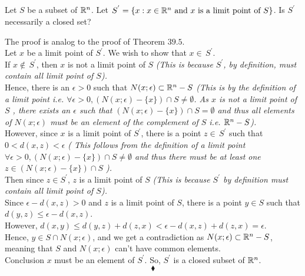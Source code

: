 \subsection{}
\begin{tcolorbox}
Let $S$ be a subset of $\mathbb{R}^n$. Let $S^{'}= \{x:x \in \mathbb{R}^n \text{ and } x \text{ is a limit point of } S\}$. Is $S^{'}$ necessarily a closed set?
\end{tcolorbox}
The proof is analog to the proof of Theorem $\mathbf{39.5}$.\\
Let $x$ be a limit point of $S^{'}$. We wish to show that $x \in \, S^{'}$.\\
If $x \not \in \, S^{'}$, then  $x$ is not a limit point of $S$
    \textit{(This is because $S^{'}$, by definition, must contain all limit point of $S$).}\\
Hence, there is an $\epsilon  > 0$
such that $N(x; \epsilon)\subset \mathbb{R}^n- S$ 
\textit{(This is by the definition of a limit point i.e. $\forall\epsilon>0, (N(x; \epsilon)-\{x\})\cap S\neq \emptyset$. As $x$ is not a limit point of $S$ , there exists an $\epsilon$ such that  $(N(x; \epsilon)-\{x\})\cap S= \emptyset$ and thus all elements of $N(x; \epsilon)$ must be an element of the complement of $S$ i.e. $\mathbb{R}^n-S$).}\\
However, since $x$ is a limit point of $S^{'}$, there is a
point $z \in \,  S^{'}$ such that $0 < d(x, z) < \epsilon$ 
\textit{( This follows from the definition of a limit point $\forall\epsilon>0, (N(x; \epsilon)-\{x\})\cap S\neq \emptyset$ and thus there must be at least one $z\in(N(x; \epsilon)-\{x\})\cap S$ ).}\\
Then since $z\in S^{'}$, $z$ is a limit point of $S$ 
\textit{(This is because $S^{'}$ by definition must contain all limit point of $S$).}\\
Since $\epsilon - d(x, z) > 0$ and $z$ is a limit point of $S$, there is a point $y\in S$ such that
$d(y, z) \leq  \epsilon - d(x, z)$.\\
However, $d(x, y) \leq d(y, z) + d(z, x) < \epsilon - d(x, z) +d(z, x) = \epsilon$.\\
Hence, $y\in S\cap N(x;\epsilon)$, and we get a contradiction as $N(x; \epsilon)\subset \mathbb{R}^n- S$, meaning that $S$ and $N(x; \epsilon)$ can't have common elements.\\
Conclusion $x$ must be an element of $S^{'}$. So, $S^{'}$ is a closed subset of $\mathbb{R}^n$.
$$\blacklozenge$$\\

